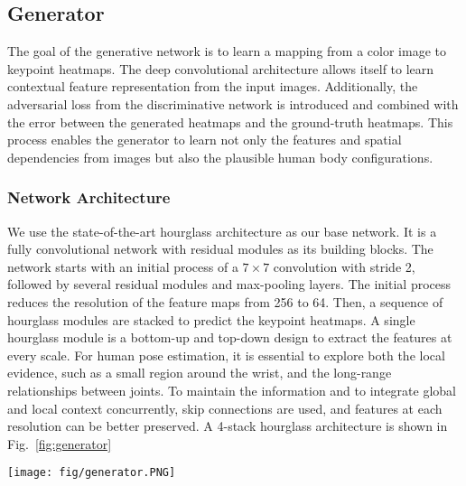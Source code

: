 \documentclass[10pt,twocolumn,letterpaper]{article}
\begin{document}
\subsection{Generator}
The goal of the generative network is to learn a mapping from a color image to keypoint heatmaps. The deep convolutional architecture allows itself to learn contextual feature representation from the input images. Additionally, the adversarial loss from the discriminative network is introduced and combined with the error between the generated heatmaps and the ground-truth heatmaps. This process enables the generator to learn not only the features and spatial dependencies from images but also the plausible human body configurations.

\subsubsection{Network Architecture}
We use the state-of-the-art hourglass architecture \cite{NewellYD16} as our base network. It is a fully convolutional network with residual modules as its building blocks. The network starts with an initial process of a $7\times7$ convolution with stride 2, followed by several residual modules and max-pooling layers. The initial process reduces the resolution of the feature maps from 256 to 64. Then, a sequence of hourglass modules are stacked to predict the keypoint heatmaps. A single hourglass module is a bottom-up and top-down design to extract the features at every scale. For human pose estimation, it is essential to explore both the local evidence, such as a small region around the wrist, and the long-range relationships between joints. To maintain the information and to integrate global and local context concurrently, skip connections are used, and features at each resolution can be better preserved. A 4-stack hourglass architecture is shown in Fig.~\ref{fig:generator}

\begin{figure*}[t]
	\centering
	\texttt{[image: fig/generator.PNG]}
    \caption{The architecture of 4-stack hourglass. The hourglass module consists of residual blocks (zoomed-in at bottom-left), pooling layers, upsampling layers, and skip connections. Between each pair of consecutive hourglass stacks, there is a transition block (yellow box) which produces intermediate heatmaps and adds them to the main trunk of the network.}
    \label{fig:generator}
\end{figure*}
\end{document}
